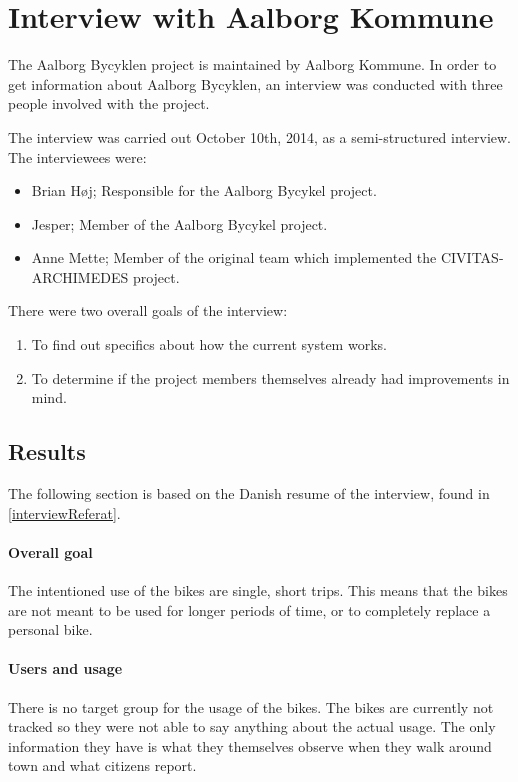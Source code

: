 \section{Interview with Aalborg Kommune}
The Aalborg Bycyklen project is maintained by Aalborg Kommune.
In order to get information about Aalborg Bycyklen, an interview was conducted with three people involved with the project.

The interview was carried out October 10th, 2014, as a semi-structured interview.
The interviewees were:
\begin{itemize}
\item Brian Høj; Responsible for the Aalborg Bycykel project.
\item Jesper; Member of the Aalborg Bycykel project.
\item Anne Mette; Member of the original team which implemented the CIVITAS-ARCHIMEDES project.
\end{itemize}

\noindent There were two overall goals of the interview:
\begin{enumerate}
\item To find out specifics about how the current system works.
\item To determine if the project members themselves already had improvements in mind.
\end{enumerate}

\subsection{Results} \label{interview:goals}
The following section is based on the Danish resume of the interview, found in \cref{interviewReferat}.

\paragraph{Overall goal}
The intentioned use of the bikes are single, short trips.
This means that the bikes are not meant to be used for longer periods of time, or to completely replace a personal bike.

\paragraph{Users and usage}
There is no target group for the usage of the bikes.
The bikes are currently not tracked so they were not able to say anything about the actual usage.
The only information they have is what they themselves observe when they walk around town and what citizens report.

